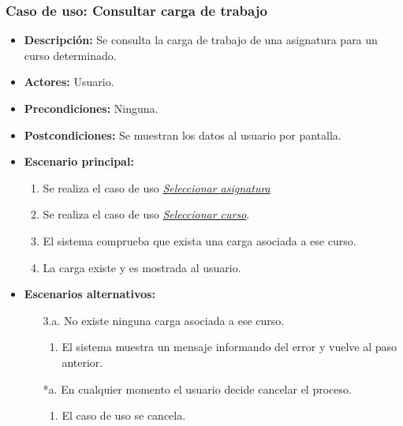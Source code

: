 \documentclass{book}
\begin{document}
\subsubsection*{Caso de uso: Consultar carga de trabajo}
\begin{itemize}
\item{\bf Descripción:} Se consulta la carga de trabajo de una asignatura para un curso determinado.
\item{\bf Actores:} Usuario.
\item{\bf Precondiciones:} Ninguna.
\item{\bf Postcondiciones:} Se muestran los datos al usuario por pantalla.
\item{\bf Escenario principal:}
	\begin{enumerate}
	\item Se realiza el caso de uso {\em \hyperref[select_asignatura]{Seleccionar asignatura}}
	\item Se realiza el caso de uso {\em \hyperref[select_curso]{Seleccionar curso}}.
	\item El sistema comprueba que exista una carga asociada a ese curso.
	\item La carga existe y es mostrada al usuario.
	\end{enumerate}
\item{\bf Escenarios alternativos:}
	\begin{itemize}
	\item[3.a.]No existe ninguna carga asociada a ese curso.
		\begin{enumerate}
		\item El sistema muestra un mensaje informando del error y vuelve al paso anterior.
		\end{enumerate}
	\item[*a.]En cualquier momento el usuario decide cancelar el proceso.
		\begin{enumerate}
		\item El caso de uso se cancela.
		\end{enumerate}		
	\end{itemize}
\end{itemize}
\end{document}

